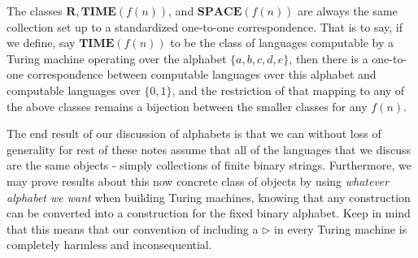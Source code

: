 \begin{corollary}
	The classes $\bm{R},\bm{TIME}(f(n))$, and $\bm{SPACE}(f(n))$ are always the same collection set up to a standardized one-to-one correspondence. That is to say, if we define, say $\bm{TIME}(f(n))$ to be the class of languages computable by a Turing machine operating over the alphabet $\{a,b,c,d,e\}$, then there is a one-to-one correspondence between computable languages over this alphabet and computable languages over $\{0,1\}$, and the restriction of that mapping to any of the above classes remains a bijection between the smaller classes for any $f(n)$. 
\end{corollary} 
The end result of our discussion of alphabets is that we can without loss of generality for rest of these notes assume that all of the languages that we discuss are the same objects - simply collections of finite binary strings. Furthermore, we may prove results about this now concrete class of objects by using \textit{whatever alphabet we want} when building Turing machines, knowing that any construction can be converted into a construction for the fixed binary alphabet. Keep in mind that this means that our convention of including a $\triangleright$ in every Turing machine is completely harmless and inconsequential.

